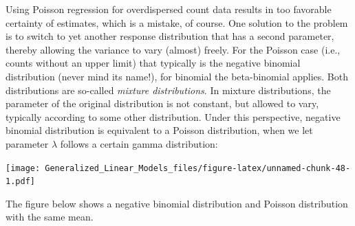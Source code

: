 \documentclass[]{svmono}
\newenvironment{Shaded}{\begin{snugshade}}{\end{snugshade}}
\newcommand{\KeywordTok}[1]{\textcolor[rgb]{0.13,0.29,0.53}{\textbf{#1}}}
\newcommand{\DataTypeTok}[1]{\textcolor[rgb]{0.13,0.29,0.53}{#1}}
\newcommand{\DecValTok}[1]{\textcolor[rgb]{0.00,0.00,0.81}{#1}}
\newcommand{\StringTok}[1]{\textcolor[rgb]{0.31,0.60,0.02}{#1}}
\newcommand{\ControlFlowTok}[1]{\textcolor[rgb]{0.13,0.29,0.53}{\textbf{#1}}}
\newcommand{\OperatorTok}[1]{\textcolor[rgb]{0.81,0.36,0.00}{\textbf{#1}}}
\newcommand{\NormalTok}[1]{#1}
\theoremstyle{definition}
\theoremstyle{definition}
\theoremstyle{definition}
\theoremstyle{remark}
\begin{document}
Using Poisson regression for overdispersed count data results in too
favorable certainty of estimates, which is a mistake, of course. One
solution to the problem is to switch to yet another response
distribution that has a second parameter, thereby allowing the variance
to vary (almost) freely. For the Poisson case (i.e., counts without an
upper limit) that typically is the negative binomial distribution (never
mind its name!), for binomial the beta-binomial applies. Both
distributions are so-called \emph{mixture distributions}. In mixture
distributions, the parameter of the original distribution is not
constant, but allowed to vary, typically according to some other
distribution. Under this perspective, negative binomial distribution is
equivalent to a Poisson distribution, when we let parameter \(\lambda\)
follows a certain gamma distribution:

\begin{Shaded}
\end{Shaded}

\texttt{[image: Generalized\_Linear\_Models\_files/figure-latex/unnamed-chunk-48-1.pdf]}

The figure below shows a negative binomial distribution and Poisson
distribution with the same mean.

\begin{Shaded}
\end{Shaded}
\end{document}
